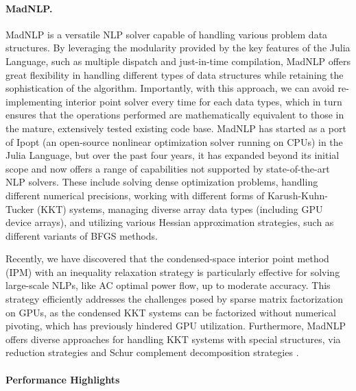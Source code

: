 \paragraph{MadNLP.}

MadNLP is a versatile NLP solver capable of
handling various problem data structures. By leveraging the modularity
provided by the key features of the Julia Language, such as multiple
dispatch and just-in-time compilation, MadNLP offers great flexibility
in handling different types of data structures while retaining the
sophistication of the algorithm. Importantly, with this approach, we can avoid
re-implementing interior point solver every time for each data types,
which in turn ensures that the operations performed are mathematically
equivalent to those in the mature, extensively tested existing code
base. MadNLP has started as a port of Ipopt (an open-source nonlinear
optimization solver running on CPUs) in the Julia Language, but over
the past four years, it has expanded beyond its initial scope and now
offers a range of capabilities not supported by state-of-the-art NLP
solvers. These include solving dense optimization problems, handling
different numerical precisions, working with different forms of Karush-Kuhn-Tucker (KKT)
systems, managing diverse array data types (including GPU device
arrays), and utilizing various Hessian approximation strategies, such
as different variants of BFGS methods.

Recently, we have discovered that the condensed-space interior point
method (IPM) with an inequality relaxation strategy is particularly
effective for solving large-scale NLPs, like AC optimal power flow, up
to moderate accuracy. This strategy efficiently addresses the
challenges posed by sparse matrix factorization on GPUs, as the
condensed KKT systems can be factorized without numerical pivoting,
which has previously hindered GPU utilization.  Furthermore, MadNLP
offers diverse approaches for handling KKT systems with special
structures, via reduction strategies \cite{pacaud2023accelerating} and
Schur complement decomposition strategies \cite{pacaud2023parallel}.



\paragraph{Performance Highlights}

